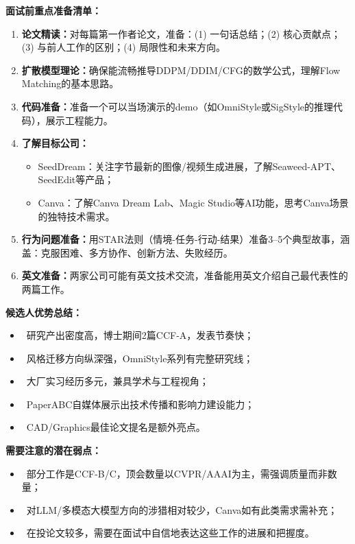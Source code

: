 \documentclass[11pt,a4paper]{article}
\begin{document}
\begin{mdframed}[backgroundcolor=bgorange, linecolor=orange!50, linewidth=1pt]
\textbf{面试前重点准备清单：}

\begin{enumerate}
  \item \textbf{论文精读：}对每篇第一作者论文，准备：(1) 一句话总结；(2) 核心贡献点；(3) 与前人工作的区别；(4) 局限性和未来方向。

  \item \textbf{扩散模型理论：}确保能流畅推导DDPM/DDIM/CFG的数学公式，理解Flow Matching的基本思路。

  \item \textbf{代码准备：}准备一个可以当场演示的demo（如OmniStyle或SigStyle的推理代码），展示工程能力。

  \item \textbf{了解目标公司：}
  \begin{itemize}
    \item SeedDream：关注字节最新的图像/视频生成进展，了解Seaweed-APT、SeedEdit等产品；
    \item Canva：了解Canva Dream Lab、Magic Studio等AI功能，思考Canva场景的独特技术需求。
  \end{itemize}

  \item \textbf{行为问题准备：}用STAR法则（情境-任务-行动-结果）准备3--5个典型故事，涵盖：克服困难、多方协作、创新方法、失败经历。

  \item \textbf{英文准备：}两家公司可能有英文技术交流，准备能用英文介绍自己最代表性的两篇工作。
\end{enumerate}
\end{mdframed}

\vspace{1em}

\begin{mdframed}[backgroundcolor=bglight, linecolor=interviewer!50, linewidth=1pt]
\textbf{候选人优势总结：}
\begin{itemize}
  \item \faCheckCircle\ 研究产出密度高，博士期间2篇CCF-A，发表节奏快；
  \item \faCheckCircle\ 风格迁移方向纵深强，OmniStyle系列有完整研究线；
  \item \faCheckCircle\ 大厂实习经历多元，兼具学术与工程视角；
  \item \faCheckCircle\ PaperABC自媒体展示出技术传播和影响力建设能力；
  \item \faCheckCircle\ CAD/Graphics最佳论文提名是额外亮点。
\end{itemize}

\textbf{需要注意的潜在弱点：}
\begin{itemize}
  \item \faExclamationTriangle\ 部分工作是CCF-B/C，顶会数量以CVPR/AAAI为主，需强调质量而非数量；
  \item \faExclamationTriangle\ 对LLM/多模态大模型方向的涉猎相对较少，Canva如有此类需求需补充；
  \item \faExclamationTriangle\ 在投论文较多，需要在面试中自信地表达这些工作的进展和把握度。
\end{itemize}
\end{mdframed}
\end{document}
